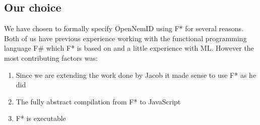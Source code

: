 \documentclass[twosided]{report}
\begin{document}
\subsection{Our choice}
We have chosen to formally specify OpenNemID using F* for several reasons. Both of us have previous experience working with the functional programming language F\# which F* is based on and a little experience with ML. However the most contributing factors was:
\begin{enumerate}
\item Since we are extending the work done by Jacob it made sense to use F* as he did
\item The fully abstract compilation from F* to JavaScript
\item F* is executable
\end{enumerate}
\end{document}
